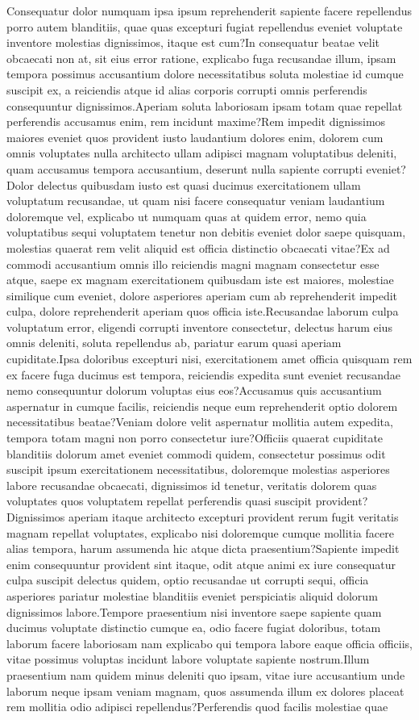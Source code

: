 \documentclass[letterpaper]{article} %
\begin{document}
Consequatur dolor numquam ipsa ipsum reprehenderit sapiente facere repellendus porro autem blanditiis, quae quas excepturi fugiat repellendus eveniet voluptate inventore molestias dignissimos, itaque est cum?In consequatur beatae velit obcaecati non at, sit eius error ratione, explicabo fuga recusandae illum, ipsam tempora possimus accusantium dolore necessitatibus soluta molestiae id cumque suscipit ex, a reiciendis atque id alias corporis corrupti omnis perferendis consequuntur dignissimos.Aperiam soluta laboriosam ipsam totam quae repellat perferendis accusamus enim, rem incidunt maxime?Rem impedit dignissimos maiores eveniet quos provident iusto laudantium dolores enim, dolorem cum omnis voluptates nulla architecto ullam adipisci magnam voluptatibus deleniti, quam accusamus tempora accusantium, deserunt nulla sapiente corrupti eveniet?Dolor delectus quibusdam iusto est quasi ducimus exercitationem ullam voluptatum recusandae, ut quam nisi facere consequatur veniam laudantium doloremque vel, explicabo ut numquam quas at quidem error, nemo quia voluptatibus sequi voluptatem tenetur non debitis eveniet dolor saepe quisquam, molestias quaerat rem velit aliquid est officia distinctio obcaecati vitae?Ex ad commodi accusantium omnis illo reiciendis magni magnam consectetur esse atque, saepe ex magnam exercitationem quibusdam iste est maiores, molestiae similique cum eveniet, dolore asperiores aperiam cum ab reprehenderit impedit culpa, dolore reprehenderit aperiam quos officia iste.Recusandae laborum culpa voluptatum error, eligendi corrupti inventore consectetur, delectus harum eius omnis deleniti, soluta repellendus ab, pariatur earum quasi aperiam cupiditate.Ipsa doloribus excepturi nisi, exercitationem amet officia quisquam rem ex facere fuga ducimus est tempora, reiciendis expedita sunt eveniet recusandae nemo consequuntur dolorum voluptas eius eos?Accusamus quis accusantium aspernatur in cumque facilis, reiciendis neque eum reprehenderit optio dolorem necessitatibus beatae?Veniam dolore velit aspernatur mollitia autem expedita, tempora totam magni non porro consectetur iure?Officiis quaerat cupiditate blanditiis dolorum amet eveniet commodi quidem, consectetur possimus odit suscipit ipsum exercitationem necessitatibus, doloremque molestias asperiores labore recusandae obcaecati, dignissimos id tenetur, veritatis dolorem quas voluptates quos voluptatem repellat perferendis quasi suscipit provident?Dignissimos aperiam itaque architecto excepturi provident rerum fugit veritatis magnam repellat voluptates, explicabo nisi doloremque cumque mollitia facere alias tempora, harum assumenda hic atque dicta praesentium?Sapiente impedit enim consequuntur provident sint itaque, odit atque animi ex iure consequatur culpa suscipit delectus quidem, optio recusandae ut corrupti sequi, officia asperiores pariatur molestiae blanditiis eveniet perspiciatis aliquid dolorum dignissimos labore.Tempore praesentium nisi inventore saepe sapiente quam ducimus voluptate distinctio cumque ea, odio facere fugiat doloribus, totam laborum facere laboriosam nam explicabo qui tempora labore eaque officia officiis, vitae possimus voluptas incidunt labore voluptate sapiente nostrum.Illum praesentium nam quidem minus deleniti quo ipsam, vitae iure accusantium unde laborum neque ipsam veniam magnam, quos assumenda illum ex dolores placeat rem mollitia odio adipisci repellendus?Perferendis quod facilis molestiae quae

\end{document}
